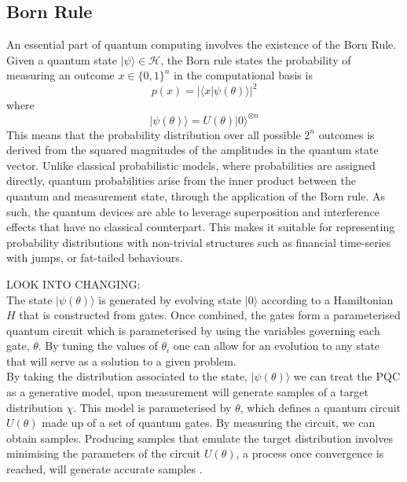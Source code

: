 \documentclass[12pt]{article}
\newcommand{\newp}
    {
    \vskip 0.5cm 
  }
\numberwithin{equation}{section}
\begin{document}
\subsection{Born Rule}
An essential part of quantum computing involves the existence of the Born
Rule. Given a quantum state $|\psi\rangle \in \mathcal{H}$, the Born rule states 
the probability of measuring an outcome $x \in \{0,1\}^n$ in the computational 
basis is
\begin{equation}
p(x) = |\langle x|\psi(\theta)\rangle|^2
\end{equation} where 
\begin{equation}
|\psi(\theta)\rangle = U(\theta)|0\rangle^{\otimes n}
\end{equation}
This means that the probability distribution over all possible $2^n$ outcomes 
is derived from the squared magnitudes of the amplitudes in the quantum state 
vector. Unlike classical probabilistic models, where probabilities are assigned 
directly, quantum probabilities arise from the inner product between the quantum 
and measurement state, through the application of the Born rule. As such, the 
quantum devices are able to leverage superposition and interference effects that 
have no classical counterpart. This makes it suitable for representing probability 
distributions with non-trivial structures such as financial time-series with jumps, 
or fat-tailed behaviours.
\newp
LOOK INTO CHANGING:\\
The state $|\psi(\theta)\rangle$ is generated by evolving state $|0\rangle$
according to a Hamiltonian $H$ that is constructed from gates. Once combined, the 
gates form a parameterised quantum circuit which is parameterised by using the 
variables governing each gate, $\theta$. By tuning the values of $\theta_i$ one 
can allow for an evolution to any state that will serve as a solution to a given 
problem. \\ 
By taking the distribution associated to the state, $|\psi(\theta)\rangle$ we can 
treat the PQC as a generative model, upon measurement will 
generate samples of a target distribution $\chi$. This model is parameterised 
by $\theta$, which defines a quantum circuit $U(\theta)$ made up of a set of quantum 
gates.
By measuring the circuit, we can obtain samples. Producing samples that emulate 
the target distribution involves minimising the parameters of the circuit $U(\theta)$, 
a process once convergence is reached, will generate accurate samples 
\cite{liu_differentiable_2018}.
\end{document}
